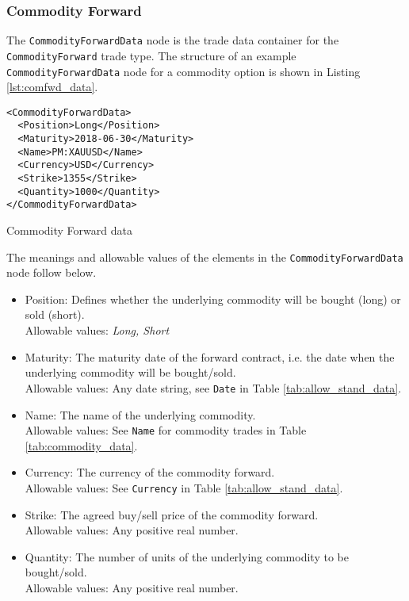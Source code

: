 \subsubsection{Commodity Forward}

The \lstinline!CommodityForwardData!  node is the trade data container for the  {\tt CommodityForward} trade type.   The structure of an example \lstinline!CommodityForwardData! node for a commodity option is shown in 
Listing \ref{lst:comfwd_data}.

\begin{listing}[H]
\begin{verbatim}
<CommodityForwardData>
  <Position>Long</Position>
  <Maturity>2018-06-30</Maturity>
  <Name>PM:XAUUSD</Name>
  <Currency>USD</Currency>
  <Strike>1355</Strike>
  <Quantity>1000</Quantity>
</CommodityForwardData>
\end{verbatim}
\caption{Commodity Forward data}
\label{lst:comfwd_data}
\end{listing}

The meanings and allowable values of the elements in the \lstinline!CommodityForwardData!  node follow below.

\begin{itemize}
	\item Position: Defines whether the underlying commodity will be bought (long) or sold (short). \\
	Allowable values: \emph{Long, Short}
	\item Maturity: The maturity date of the forward contract, i.e. the date when the underlying commodity will be bought/sold. \\
	Allowable values: Any date string, see \lstinline!Date! in Table \ref{tab:allow_stand_data}.
	\item Name: The name of the underlying commodity. \\
	Allowable values:  See \lstinline!Name! for commodity trades in Table \ref{tab:commodity_data}. \\
	\item Currency: The  currency of the commodity forward. \\
	Allowable values:  See \lstinline!Currency! in Table \ref{tab:allow_stand_data}.	
	\item Strike: The agreed buy/sell price of the commodity forward. \\
	Allowable values:  Any positive real number.	
	\item Quantity: The number of units of the underlying commodity to be bought/sold. \\
	Allowable values:  Any positive real number.
\end{itemize}
